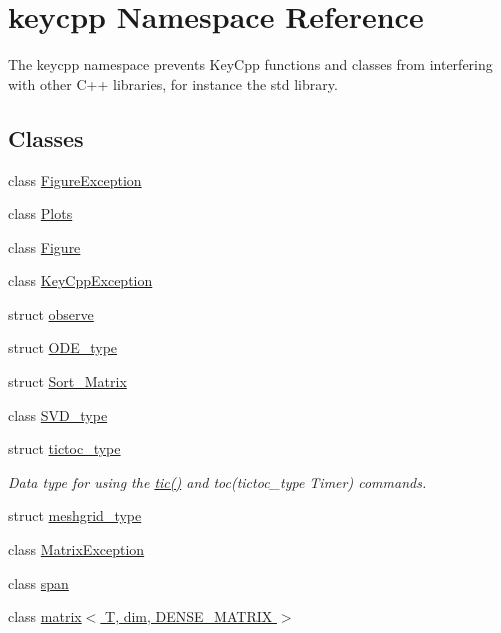 \hypertarget{namespacekeycpp}{\section{keycpp Namespace Reference}
\label{namespacekeycpp}
}


The keycpp namespace prevents Key\-Cpp functions and classes from interfering with other C++ libraries, for instance the std library.  


\subsection*{Classes}
\begin{DoxyCompactItemize}
\item 
class \hyperlink{classkeycpp_1_1_figure_exception}{Figure\-Exception}
\item 
class \hyperlink{classkeycpp_1_1_plots}{Plots}
\item 
class \hyperlink{classkeycpp_1_1_figure}{Figure}
\item 
class \hyperlink{classkeycpp_1_1_key_cpp_exception}{Key\-Cpp\-Exception}
\item 
struct \hyperlink{structkeycpp_1_1observe}{observe}
\item 
struct \hyperlink{structkeycpp_1_1_o_d_e__type}{O\-D\-E\-\_\-type}
\item 
struct \hyperlink{structkeycpp_1_1_sort___matrix}{Sort\-\_\-\-Matrix}
\item 
class \hyperlink{classkeycpp_1_1_s_v_d__type}{S\-V\-D\-\_\-type}
\item 
struct \hyperlink{structkeycpp_1_1tictoc__type}{tictoc\-\_\-type}
\begin{DoxyCompactList}\small\item\em Data type for using the \hyperlink{namespacekeycpp_a6069a9eec0edfa1d401230013d98765e}{tic()} and toc(tictoc\-\_\-type Timer) commands. \end{DoxyCompactList}\item 
struct \hyperlink{structkeycpp_1_1meshgrid__type}{meshgrid\-\_\-type}
\item 
class \hyperlink{classkeycpp_1_1_matrix_exception}{Matrix\-Exception}
\item 
class \hyperlink{classkeycpp_1_1span}{span}
\item 
class \hyperlink{classkeycpp_1_1matrix_3_01_t_00_01dim_00_01_d_e_n_s_e___m_a_t_r_i_x_01_4}{matrix$<$ T, dim, D\-E\-N\-S\-E\-\_\-\-M\-A\-T\-R\-I\-X $>$}
\item 

\end{DoxyCompactItemize}
